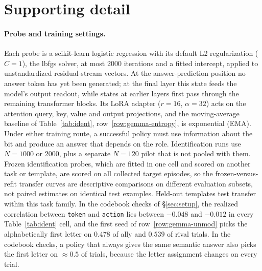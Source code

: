 \documentclass{article}
\begin{document}
\label{endofmaintext}




\appendix

\section{Supporting detail}
\label{app:supporting}

\paragraph{Probe and training settings.}
\label{app:ws-settings}
Each probe is a scikit-learn logistic regression with its default L2 regularization ($C=1$), the lbfgs solver, at most 2000 iterations and a fitted intercept, applied to unstandardized residual-stream vectors. At the answer-prediction position no answer token has yet been generated; at the final layer this state feeds the model's output readout, while states at earlier layers first pass through the remaining transformer blocks. Its LoRA adapter ($r{=}16$, $\alpha{=}32$) acts on the attention query, key, value and output projections, and the moving-average baseline of Table~\ref{tab:ident}, row~\ref{row:gemma-entropy}, is exponential (EMA). Under either training route, a successful policy must use information about the bit and produce an answer that depends on the role. Identification runs use $N=1000$ or $2000$, plus a separate $N=120$ pilot that is not pooled with them. Frozen identification probes, which are fitted in one cell and scored on another task or template, are scored on all collected target episodes, so the frozen-versus-refit transfer curves are descriptive comparisons on different evaluation subsets, not paired estimates on identical test examples. Held-out templates test transfer within this task family. In the codebook checks of \S\ref{sec:setup}, the realized correlation between \texttt{token} and \texttt{action} lies between $-0.048$ and $-0.012$ in every Table~\ref{tab:ident} cell, and the first seed of row~\ref{row:gemma-unmod} picks the alphabetically first letter on $0.478$ of ally and $0.539$ of rival trials. In the codebook checks, a policy that always gives the same semantic answer also picks the first letter on ${\approx}0.5$ of trials, because the letter assignment changes on every trial.
\end{document}
